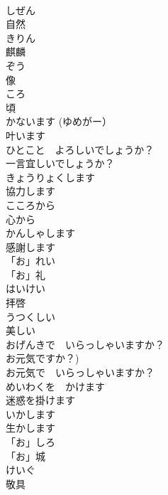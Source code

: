 \documentclass[8pt]{extreport}
\begin{document}
\begin{CJK}{UTF8}{min}
\\	しぜん	
\\	自然		
\\	きりん	
\\	麒麟		
\\	ぞう	
\\	像		
\\	ころ	
\\	頃		
\\	かないます (ゆめがー）	
\\	叶います		
\\	ひとこと　よろしいでしょうか？	
\\	一言宜しいでしょうか？		
\\	きょうりょくします	
\\	協力します		
\\	こころから	
\\	心から		
\\	かんしゃします	
\\	感謝します		
\\	「お」れい	
\\	「お」礼		
\\	はいけい	
\\	拝啓		
\\	うつくしい	
\\	美しい		
\\	おげんきで　いらっしゃいますか？	
\\	お元気ですか？) 
\\	お元気で　いらっしゃいますか？		
\\	めいわくを　かけます	
\\	迷惑を掛けます		
\\	いかします	
\\	生かします		
\\	「お」しろ	
\\	「お」城		
\\	けいぐ	
\\	敬具		
\end{CJK}
\end{document}
